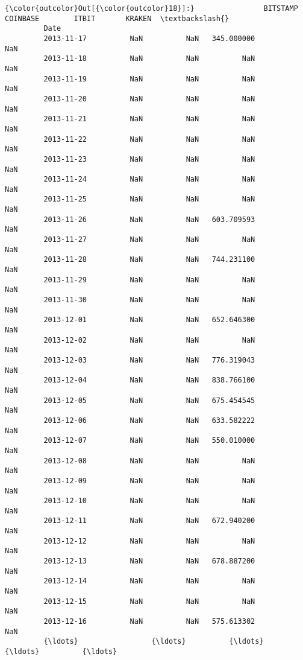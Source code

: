 \documentclass[11pt]{article}
\begin{document}
\begin{Verbatim}[commandchars=\\\{\}]
{\color{outcolor}Out[{\color{outcolor}18}]:}                BITSTAMP     COINBASE        ITBIT       KRAKEN  \textbackslash{}
         Date                                                             
         2013-11-17          NaN          NaN   345.000000          NaN   
         2013-11-18          NaN          NaN          NaN          NaN   
         2013-11-19          NaN          NaN          NaN          NaN   
         2013-11-20          NaN          NaN          NaN          NaN   
         2013-11-21          NaN          NaN          NaN          NaN   
         2013-11-22          NaN          NaN          NaN          NaN   
         2013-11-23          NaN          NaN          NaN          NaN   
         2013-11-24          NaN          NaN          NaN          NaN   
         2013-11-25          NaN          NaN          NaN          NaN   
         2013-11-26          NaN          NaN   603.709593          NaN   
         2013-11-27          NaN          NaN          NaN          NaN   
         2013-11-28          NaN          NaN   744.231100          NaN   
         2013-11-29          NaN          NaN          NaN          NaN   
         2013-11-30          NaN          NaN          NaN          NaN   
         2013-12-01          NaN          NaN   652.646300          NaN   
         2013-12-02          NaN          NaN          NaN          NaN   
         2013-12-03          NaN          NaN   776.319043          NaN   
         2013-12-04          NaN          NaN   838.766100          NaN   
         2013-12-05          NaN          NaN   675.454545          NaN   
         2013-12-06          NaN          NaN   633.582222          NaN   
         2013-12-07          NaN          NaN   550.010000          NaN   
         2013-12-08          NaN          NaN          NaN          NaN   
         2013-12-09          NaN          NaN          NaN          NaN   
         2013-12-10          NaN          NaN          NaN          NaN   
         2013-12-11          NaN          NaN   672.940200          NaN   
         2013-12-12          NaN          NaN          NaN          NaN   
         2013-12-13          NaN          NaN   678.887200          NaN   
         2013-12-14          NaN          NaN          NaN          NaN   
         2013-12-15          NaN          NaN          NaN          NaN   
         2013-12-16          NaN          NaN   575.613302          NaN   
         {\ldots}                 {\ldots}          {\ldots}          {\ldots}          {\ldots}   

\end{Verbatim}
\end{document}
